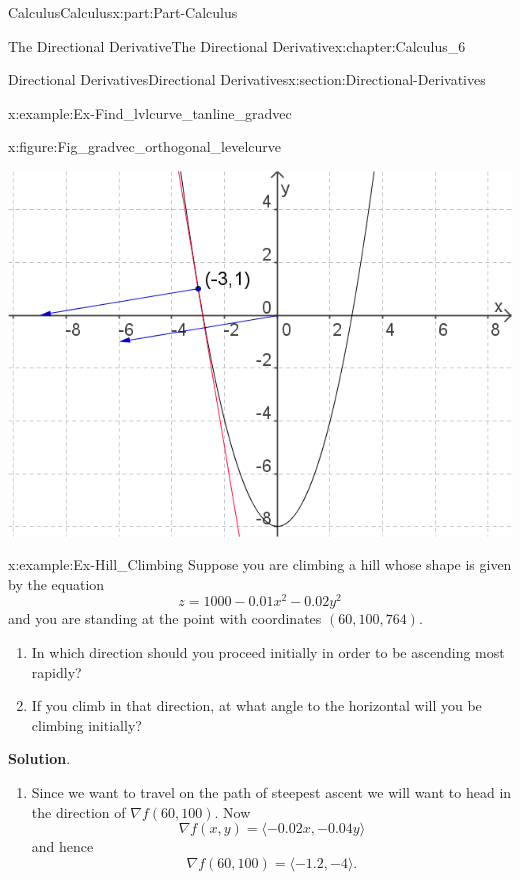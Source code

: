 \documentclass[oneside,10pt,]{book}
\newcommand{\blocktitlefont}{\relax}
\numberwithin{equation}{section}
\begin{document}
\begin{partptx}{Calculus}{}{Calculus}{}{}{x:part:Part-Calculus}
\begin{chapterptx}{The Directional Derivative}{}{The Directional Derivative}{}{}{x:chapter:Calculus_6}
\begin{sectionptx}{Directional Derivatives}{}{Directional Derivatives}{}{}{x:section:Directional-Derivatives}
\begin{example}{}{x:example:Ex-Find_lvlcurve_tanline_gradvec}
\begin{figureptx}{}{x:figure:Fig_gradvec_orthogonal_levelcurve}{}
\begin{image}{0.15}{0.7}{0.15}
\includegraphics[width=\linewidth]{./Calculus/Images/6/Fig5_gradvec_orthogonal_levelcurve.png}
\end{image}%
\tcblower
\end{figureptx}%
\end{example}
\begin{example}{}{x:example:Ex-Hill_Climbing}%
Suppose you are climbing a hill whose shape is given by the equation%
\begin{equation*}
z = 1000-0.01x^2 - 0.02y^2
\end{equation*}
and you are standing at the point with coordinates \((60,100,764)\). %
\begin{enumerate}[label=\alph*]
\item{}In which direction should you proceed initially in order to be ascending most rapidly?%
\item{}If you climb in that direction, at what angle to the horizontal will you be climbing initially?%
\end{enumerate}
%
%
\par\smallskip%
\noindent\textbf{\blocktitlefont Solution}.\hypertarget{g:solution:id550336}{}\quad{}%
\begin{enumerate}[label=\alph*]
\item{}Since we want to travel on the path of steepest ascent we will want to head in the direction of \(\nabla f(60,100)\). Now%
\begin{equation*}
\nabla f(x,y) = \langle -0.02x, -0.04y \rangle
\end{equation*}
and hence%
\begin{equation*}
\nabla f (60,100) = \langle-1.2,-4 \rangle\text{.}

\end{equation*}
\end{enumerate}
\end{example}
\end{sectionptx}
\end{chapterptx}
\end{partptx}
\end{document}
